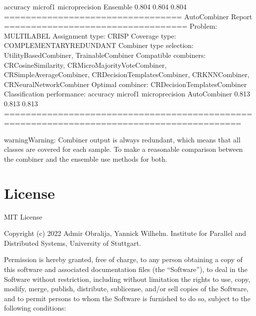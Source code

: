 \documentclass[letterpaper,10pt,english]{sphinxmanual}
\begin{document}
\begin{sphinxVerbatim}[commandchars=\\\{\}]
                                     accuracy  micro\PYGZus{}f1  micro\PYGZus{}precision
Ensemble                                0.804     0.804            0.804
================================= AutoCombiner \PYGZhy{} Report ==================================
                   Problem: MULTI\PYGZus{}LABEL
           Assignment type: CRISP
             Coverage type: COMPLEMENTARY\PYGZus{}REDUNDANT
   Combiner type selection: UtilityBasedCombiner, TrainableCombiner
      Compatible combiners: CRCosineSimilarity, CRMicroMajorityVoteCombiner, CRSimpleAverageCombiner, CRDecisionTemplatesCombiner, CRKNNCombiner, CRNeuralNetworkCombiner
          Optimal combiner: CRDecisionTemplatesCombiner
Classification performance:
                                     accuracy  micro\PYGZus{}f1  micro\PYGZus{}precision
AutoCombiner                            0.813     0.813            0.813
==========================================================================================
\end{sphinxVerbatim}

\begin{sphinxadmonition}{warning}{Warning:}
\sphinxAtStartPar
Combiner output is always redundant, which means that all classes are covered for each sample.
To make a reasonable comparison between the combiner and the ensemble use  methods for both.
\end{sphinxadmonition}


\chapter{License}
\label{\detokenize{license:license}}\label{\detokenize{license::doc}}
\sphinxAtStartPar
MIT License

\sphinxAtStartPar
Copyright (c) 2022 Admir Obralija, Yannick Wilhelm.
Institute for Parallel and Distributed Systems, University of Stuttgart.

\sphinxAtStartPar
Permission is hereby granted, free of charge, to any person obtaining a copy
of this software and associated documentation files (the “Software”), to deal
in the Software without restriction, including without limitation the rights
to use, copy, modify, merge, publish, distribute, sublicense, and/or sell
copies of the Software, and to permit persons to whom the Software is
furnished to do so, subject to the following conditions:
\end{document}
